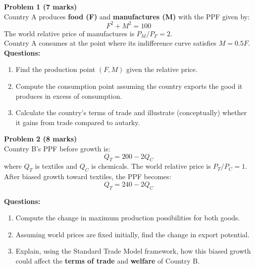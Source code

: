 \documentclass[12pt]{article}
\begin{document}
\textbf{Problem 1 (7 marks)} \\[3pt]
Country A produces \textbf{food (F)} and \textbf{manufactures (M)} with the PPF given by:
\[
F^2 + M^2 = 100
\]
The world relative price of manufactures is \( P_M / P_F = 2 \). \\
Country A consumes at the point where its indifference curve satisfies \( M = 0.5F \). \\[6pt]

\textbf{Questions:}
\begin{enumerate}
    \item Find the production point \((F, M)\) given the relative price.
    \item Compute the consumption point assuming the country exports the good it produces in excess of consumption.
    \item Calculate the country’s terms of trade and illustrate (conceptually) whether it gains from trade compared to autarky.
\end{enumerate}

\vspace{1em}

\textbf{Problem 2 (8 marks)} \\[3pt]
Country B’s PPF before growth is:
\[
Q_T = 200 - 2Q_C
\]
where \( Q_T \) is textiles and \( Q_C \) is chemicals. The world relative price is \( P_T / P_C = 1 \). \\[4pt]
After biased growth toward textiles, the PPF becomes:
\[
Q_T = 240 - 2Q_C
\]

\textbf{Questions:}
\begin{enumerate}
    \item Compute the change in maximum production possibilities for both goods.
    \item Assuming world prices are fixed initially, find the change in export potential.
    \item Explain, using the Standard Trade Model framework, how this biased growth could affect the \textbf{terms of trade} and \textbf{welfare} of Country B.
\end{enumerate}
\end{document}
